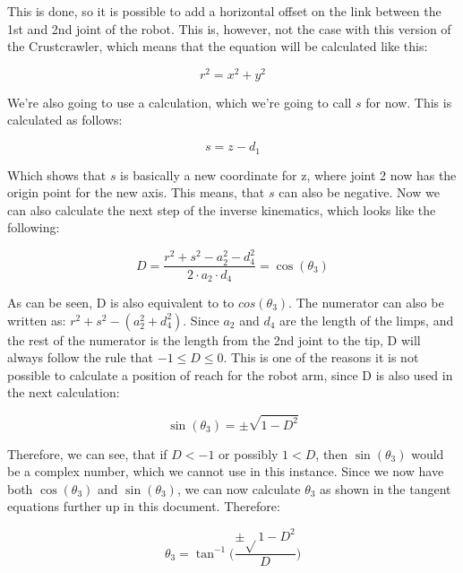 This is done, so it is possible to add a horizontal offset on the link between the 1st and 2nd joint of the robot. This is, however, not the case with this version of the Crustcrawler, which means that the equation will be calculated like this:

\begin{equation*}
    r^2 = x^2 + y^2
\end{equation*}

We're also going to use a calculation, which we're going to call $s$ for now. This is calculated as follows:

\begin{equation*}
    s = z - d_1
\end{equation*}

Which shows that $s$ is basically a new coordinate for z, where joint 2 now has the origin point for the new axis. This means, that $s$ can also be negative.\newline
Now we can also calculate the next step of the inverse kinematics, which looks like the following:

\begin{equation*}
    D = \frac{r^2 + s^2 - a_2^2 - d_4^2}{2 \cdot a_2 \cdot d_4} = \cos(\theta_3)
\end{equation*}

As can be seen, D is also equivalent to to $cos(\theta_3)$. The numerator can also be written as: $r^2 + s^2 - (a_2^2 + d_4^2)$. Since $a_2$ and $d_4$ are the length of the limps, and the rest of the numerator is the length from the 2nd joint to the tip, D will always follow the rule that $-1 \leq D \leq 0$. This is one of the reasons it is not possible to calculate a position of reach for the robot arm, since D is also used in the next calculation:

\begin{equation*}
\sin(\theta_3) = \pm \sqrt{1-D^2}    
\end{equation*}

Therefore, we can see, that if $D < -1$ or possibly $1 < D$, then $\sin(\theta_3)$ would be a complex number, which we cannot use in this instance. Since we now have both $\cos(\theta_3)$ and $\sin(\theta_3)$, we can now calculate $\theta_3$ as shown in the tangent equations further up in this document. Therefore:

\begin{equation*}
    \theta_3 = \tan^{-1}\Bigg(\frac{\pm\sqrt{}1-D^2}{D}\Bigg)
\end{equation*}


